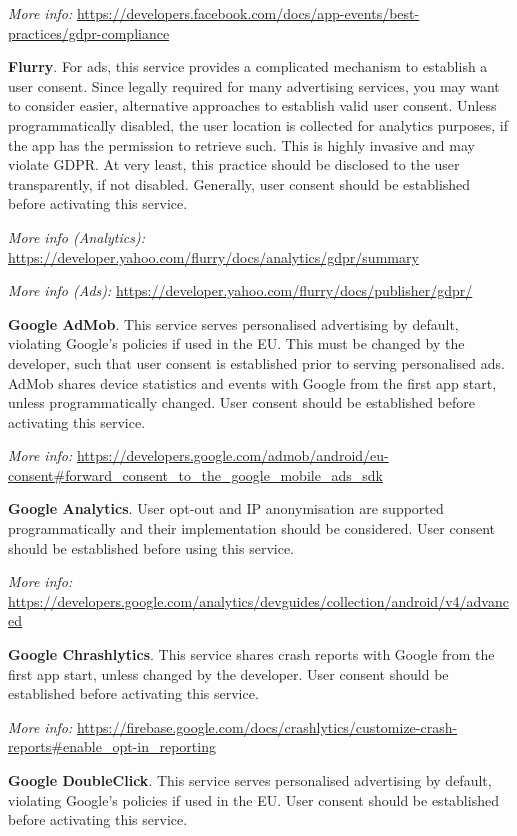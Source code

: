 \documentclass[
]{book}
\begin{document}
\emph{More info:} \url{https://developers.facebook.com/docs/app-events/best-practices/gdpr-compliance}

\textbf{Flurry}. For ads, this service provides a complicated mechanism to establish a user consent. Since legally required for many advertising services, you may want to consider easier, alternative approaches to establish valid user consent. Unless programmatically disabled, the user location is collected for analytics purposes, if the app has the permission to retrieve such. This is highly invasive and may violate GDPR. At very least, this practice should be disclosed to the user transparently, if not disabled. Generally, user consent should be established before activating this service.

\emph{More info (Analytics):} \url{https://developer.yahoo.com/flurry/docs/analytics/gdpr/summary}

\emph{More info (Ads):} \url{https://developer.yahoo.com/flurry/docs/publisher/gdpr/}

\textbf{Google AdMob}. This service serves personalised advertising by default, violating Google's policies if used in the EU. This must be changed by the developer, such that user consent is established prior to serving personalised ads. AdMob shares device statistics and events with Google from the first app start, unless programmatically changed. User consent should be established before activating this service.

\emph{More info:} \url{https://developers.google.com/admob/android/eu-consent\#forward_consent_to_the_google_mobile_ads_sdk}

\textbf{Google Analytics}. User opt-out and IP anonymisation are supported programmatically and their implementation should be considered. User consent should be established before using this service.

\emph{More info:} \url{https://developers.google.com/analytics/devguides/collection/android/v4/advanced}

\textbf{Google Chrashlytics}. This service shares crash reports with Google from the first app start, unless changed by the developer. User consent should be established before activating this service.

\emph{More info:} \url{https://firebase.google.com/docs/crashlytics/customize-crash-reports\#enable_opt-in_reporting}

\textbf{Google DoubleClick}. This service serves personalised advertising by default, violating Google's policies if used in the EU. User consent should be established before activating this service.
\end{document}
